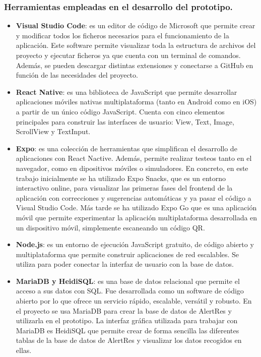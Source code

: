     \subsubsection{Herramientas empleadas en el desarrollo del prototipo.}
    \begin{itemize}
        \item \textbf{Visual Studio Code}: es un editor de código de Microsoft que permite crear y modificar todos los ficheros necesarios para el funcionamiento de la aplicación. Este software permite visualizar toda la estructura de archivos del proyecto y ejecutar ficheros ya que cuenta con un terminal de comandos. Además, se pueden descargar distintas extensiones y conectarse a GitHub en función de las necesidades del proyecto.\cite{vscode} 
        
        \item \textbf{React Native}: es una biblioteca de JavaScript que permite desarrollar aplicaciones móviles nativas multiplataforma (tanto en Android como en iOS) a partir de un único código JavaScript.  Cuenta con cinco elementos principales para construir las interfaces de usuario: View, Text, Image, ScrollView y TextInput.\cite{reactnative} 
        
        \item \textbf{Expo}: es una colección de herramientas que simplifican el desarrollo de aplicaciones con React Nactive. Además, permite realizar testeos tanto en el navegador, como en dipositivos móviles o simuladores. En concreto, en este trabajo inicialmente se ha utilizado Expo Snacks, que es un entorno interactivo online, para visualizar las primeras fases del frontend de la aplicación con correcciones y sugerencias automáticas y ya pasar el código a Visual Studio Code.  Más tarde se ha utilizado Expo Go que es una aplicación móvil que permite experimentar la aplicación multiplataforma desarrollada en un dispositivo móvil, simplemente escaneando un código QR.\cite{expo, expo_snack, expo_go}

        \item \textbf{Node.js}: es un entorno de ejecución JavaScript gratuito, de código abierto y multiplataforma que permite construir aplicaciones de red escalables. Se utiliza para poder conectar la interfaz de usuario con la base de datos.\cite{nodejs}
        
        \item \textbf{MariaDB y HeidiSQL}: es una base de datos relacional que permite el acceso a sus datos con SQL. Fue desarrollada como un software de código abierto por lo que ofrece un servicio rápido, escalable, versátil y robusto. En el proyecto se usa MariaDB para crear la base de datos de AlertRes y utilizarla en el prototipo\cite{mariadb}. La interfaz gráfica utilizada para trabajar con MariaDB es HeidiSQL que permite crear de forma sencilla las diferentes tablas de la base de datos de AlertRes y visualizar los datos recogidos en ellas.\cite{heidisql} 
        

\end{itemize}
